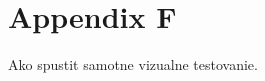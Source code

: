 \documentclass[11pt,oneside,final]{fithesis2}
\begin{document}
\chapter{Appendix F}
\label{appendix:f}
Ako spustit samotne vizualne testovanie.

    \pagestyle{plain}
    
\end{document}
